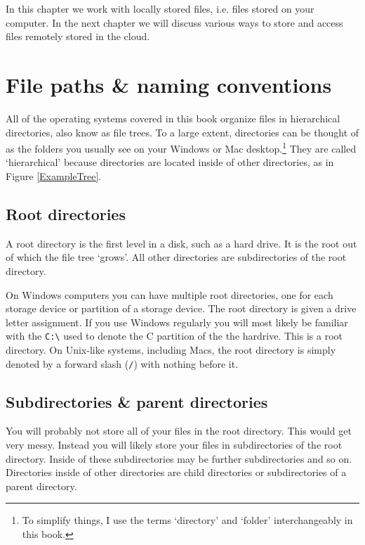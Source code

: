 In this chapter we work with locally stored files, i.e. files stored on your computer. In the next chapter we will discuss various ways to store and access files remotely stored in the cloud.


\section{File paths \& naming conventions}

All of the operating systems covered in this book organize files in hierarchical directories, also know as file trees. To a large extent, directories can be thought of as the folders you usually see on your Windows or Mac desktop.\footnote{To simplify things, I use the terms `directory' and `folder' interchangeably in this book.} They are called `hierarchical' because directories are located inside of other directories, as in Figure \ref{ExampleTree}. 

\subsection{Root directories}

A root directory is the first level in a disk, such as a hard drive. It is the root out of which the file tree `grows'. All other directories are subdirectories of the root directory.

On Windows computers you can have multiple root directories, one for each storage device or partition of a storage device. The root directory is given a drive letter assignment. If you use Windows regularly you will most likely be familiar with the \texttt{C:\textbackslash{}} used to denote the C partition of the the hardrive. This is a root directory. On Unix-like systems, including Macs, the root directory is simply denoted by a forward slash (\texttt{/}) with nothing before it.

\subsection{Subdirectories \& parent directories}

You will probably not store all of your files in the root directory. This would get very messy. Instead you will likely store your files in subdirectories of the root directory. Inside of these subdirectories may be further subdirectories and so on.  Directories inside of other directories are child directories or subdirectories of a parent directory.

